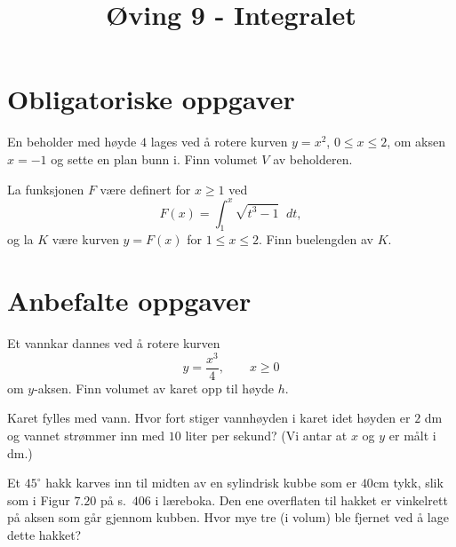 \documentclass[a4paper,norsk,11pt]{interaktiv}
\title{Øving 9 - Integralet}
\newcommand{\dee}{\mathop{}\!{d}}
\begin{document}

\maketitle


\section*{Obligatoriske oppgaver}


\begin{oppgave}{1}
  En beholder med høyde $4$ lages ved å rotere kurven
  $y = x^2$, $0 \leq x \leq 2$, om aksen $x = -1$ og sette en
  plan bunn i.  Finn volumet $V$ av beholderen.
\end{oppgave}

\begin{oppgave}{2}
  La funksjonen $F$ være definert for $x \geq 1$ ved
  \begin{equation*}
    F(x) = \int_1^x \sqrt{t^3 - 1} \dee t,
  \end{equation*}
  og la $K$ være kurven $y = F(x)$ for $1 \leq x \leq 2$.  Finn
  buelengden av $K$.
\end{oppgave}




\section*{Anbefalte oppgaver}

\begin{oppgave}{1}
  \bPunkt
    Et vannkar dannes ved å rotere kurven
    \begin{equation*}
      y = \frac{x^3}{4}, \qquad x \geq 0
    \end{equation*}
    om $y$-aksen. Finn volumet av karet opp til høyde $h$.
  \ePunkt

  \bPunkt
    Karet fylles med vann. Hvor fort stiger vannhøyden i karet
    idet høyden er $2$ dm og vannet strømmer inn med $10$ liter per
    sekund? (Vi antar at $x$ og $y$ er målt i dm.)
  \ePunkt
\end{oppgave}

\begin{oppgave}{2}
  Et $45^\circ$ hakk karves inn til midten av en sylindrisk kubbe som
  er $40$cm tykk, slik som i Figur $7.20$ på s.\ $406$ i læreboka. Den
  ene overflaten til hakket er vinkelrett på aksen som går gjennom
  kubben. Hvor mye tre (i volum) ble fjernet ved å lage dette hakket?
\end{oppgave}
\end{document}
